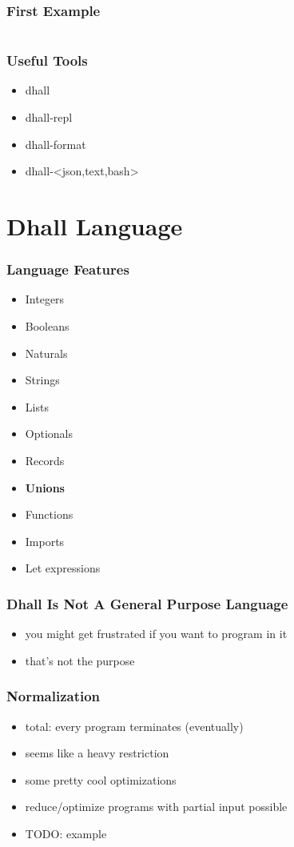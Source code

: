\documentclass{beamer}
\begin{document}
 \begin{frame}
   \frametitle{First Example}

   \inputminted{text}{dhall/example-two.dhall}
 \end{frame}

 \begin{frame}
   \frametitle{Useful Tools}
   \begin{itemize}
   \item dhall
   \item dhall-repl
   \item dhall-format
   \item dhall-<json,text,bash>
   \end{itemize}
 \end{frame}

 \section{Dhall Language}

 \begin{frame}
   \frametitle{Language Features}
   \begin{itemize}
   \item Integers
   \item Booleans
   \item Naturals
   \item Strings
   \item Lists
   \item Optionals
   \item Records
   \item \textbf{Unions}
   \item Functions
   \item Imports
   \item Let expressions
   \end{itemize}
 \end{frame}

 \begin{frame}
   \frametitle{Dhall Is Not A General Purpose Language}
   \begin{itemize}
   \item you might get frustrated if you want to program in it
   \item that's not the purpose
   \end{itemize}
 \end{frame}

 \begin{frame}
   \frametitle{Normalization}
   \begin{itemize}
   \item total: every program terminates (eventually)
   \item seems like a heavy restriction
   \item some pretty cool optimizations
   \item reduce/optimize programs with partial input possible
   \item TODO: example
   \end{itemize}
 \end{frame}
\end{document}
